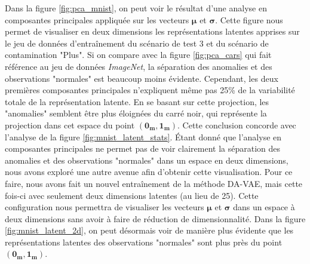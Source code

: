 Dans la figure \ref{fig:pca_mnist}, on peut voir le résultat d'une analyse en composantes principales appliquée sur les vecteurs $\boldsymbol{\mu}$ et $\boldsymbol{\sigma}$. Cette figure nous permet de visualiser en deux dimensions les représentations latentes apprises sur le jeu de données d'entraînement du scénario de test 3 et du scénario de contamination "Plus". Si on compare avec la figure \ref{fig:pca_cars} qui fait référence au jeu de données \textit{ImageNet}, la séparation des anomalies et des observations "normales" est beaucoup moins évidente. Cependant, les deux premières composantes principales n'expliquent même pas 25\% de la variabilité totale de la représentation latente. En se basant sur cette projection, les "anomalies" semblent être plus éloignées du carré noir, qui représente la projection dans cet espace du point $(\boldsymbol{0_{m}}, \boldsymbol{1_{m}})$. Cette conclusion concorde avec l'analyse de la figure \ref{fig:mnist_latent_stats}. Étant donné que l'analyse en composantes principales ne permet pas de voir clairement la séparation des anomalies et des observations "normales" dans un espace en deux dimensions, nous avons exploré une autre avenue afin d'obtenir cette visualisation. Pour ce faire, nous avons fait un nouvel entraînement de la méthode DA-VAE, mais cette fois-ci avec seulement deux dimensions latentes (au lieu de 25). Cette configuration nous permettra de visualiser les vecteurs $\boldsymbol{\mu}$ et $\boldsymbol{\sigma}$ dans un espace à deux dimensions sans avoir à faire de réduction de dimensionnalité. Dans la figure \ref{fig:mnist_latent_2d}, on peut désormais voir de manière plus évidente que les représentations latentes des observations "normales" sont plus près du point $(\boldsymbol{0_{m}}, \boldsymbol{1_{m}})$.

